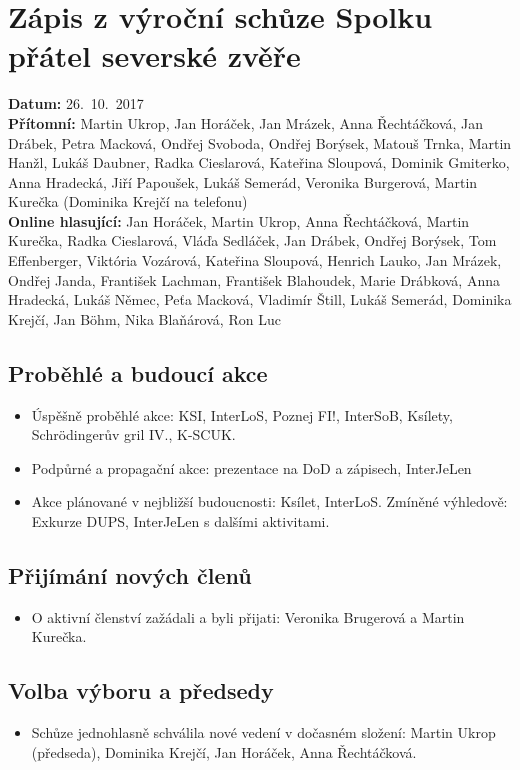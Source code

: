 \documentclass[11pt,a4paper]{article}
\begin{document}
\section*{Zápis z výroční schůze Spolku přátel severské zvěře}
\textbf{Datum:} 26.~10.~2017\\
\textbf{Přítomní:} Martin Ukrop, Jan Horáček, Jan Mrázek, Anna Řechtáčková, Jan Drábek, Petra Macková, Ondřej Svoboda, Ondřej Borýsek, Matouš Trnka, Martin Hanžl, Lukáš Daubner, Radka Cieslarová, Kateřina Sloupová, Dominik Gmiterko, Anna Hradecká, Jiří Papoušek, Lukáš Semerád, Veronika Burgerová, Martin Kurečka (Dominika Krejčí na telefonu)\\
\textbf{Online hlasující:} Jan Horáček, Martin Ukrop, Anna Řechtáčková, Martin Kurečka, Radka Cieslarová, Vláďa Sedláček, Jan Drábek, Ondřej Borýsek, Tom Effenberger, Viktória Vozárová, Kateřina Sloupová, Henrich Lauko, Jan Mrázek, Ondřej Janda, František Lachman, František Blahoudek, Marie Drábková, Anna Hradecká, Lukáš Němec, Peťa Macková, Vladimír Štill, Lukáš Semerád, Dominika Krejčí, Jan Böhm, Nika Blaňárová, Ron Luc

\subsection*{Proběhlé a budoucí akce}
\begin{itemize}[itemsep=0pt]
\item Úspěšně proběhlé akce: KSI, InterLoS, Poznej FI!, InterSoB, Ksílety, Schrödingerův gril IV., K-SCUK.
\item Podpůrné a propagační akce: prezentace na DoD a zápisech, InterJeLen
\item Akce plánované v nejbližší budoucnosti: Ksílet, InterLoS. Zmíněné výhledově: Exkurze DUPS, InterJeLen s dalšími aktivitami.
\end{itemize}

\subsection*{Přijímání nových členů}
\begin{itemize}[itemsep=0pt]
\item O aktivní členství zažádali a byli přijati: Veronika Brugerová a Martin Kurečka.
\end{itemize}

\subsection*{Volba výboru a předsedy}
\begin{itemize}[itemsep=0pt]
\item Schůze jednohlasně schválila nové vedení v dočasném složení: Martin Ukrop (předseda), Dominika Krejčí, Jan Horáček, Anna Řechtáčková.
\end{itemize}
\end{document}
